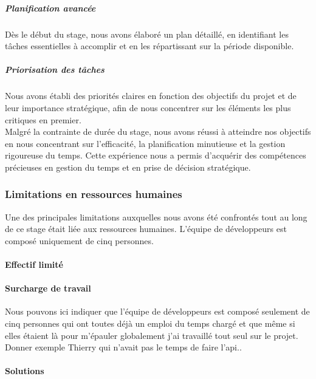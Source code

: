 \documentclass[a4paper, 12pt, french]{article}
\begin{document}
							\subparagraph{Planification avancée\\}
								Dès le début du stage, nous avons élaboré un plan détaillé, en identifiant les tâches essentielles à accomplir et en les répartissant sur la période disponible.

							\subparagraph{Priorisation des tâches\\}
								Nous avons établi des priorités claires en fonction des objectifs du projet et de leur importance stratégique, afin de nous concentrer sur les éléments les plus critiques en premier.\\

				Malgré la contrainte de durée du stage, nous avons réussi à atteindre nos objectifs en nous concentrant sur l'efficacité, la planification minutieuse et la gestion rigoureuse du temps. Cette expérience nous a permis d'acquérir des compétences précieuses en gestion du temps et en prise de décision stratégique.

					\subsubsection{Limitations en ressources humaines}
						Une des principales limitations auxquelles nous avons été confrontés tout au long de ce stage était liée aux ressources humaines. L'équipe de développeurs est composé uniquement de cinq personnes.
						
						\paragraph{Effectif limité\\}
							
						
						\paragraph{Surcharge de travail\\}
							Nous pouvons ici indiquer que l'équipe de développeurs est composé seulement de cinq personnes qui ont toutes déjà un emploi du temps chargé et que même si elles étaient là pour m'épauler globalement j'ai travaillé tout seul sur le projet. Donner exemple Thierry qui n'avait pas le temps de faire l'api..
						
						\paragraph{Solutions\\}
											
\end{document}
